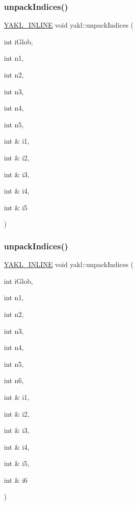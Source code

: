\mbox{\label{namespaceyakl_a030f82c405c0c5cc61833a5839a2398d}} 
\subsubsection{\texorpdfstring{unpack\+Indices()}{unpackIndices()}\hspace{0.1cm}{\footnotesize\ttfamily [4/7]}}
{\footnotesize\ttfamily \hyperlink{YAKL_8h_aa0dd629ffce6d564b19e9313fb91a5ad}{Y\+A\+K\+L\+\_\+\+I\+N\+L\+I\+NE} void yakl\+::unpack\+Indices (\begin{DoxyParamCaption}\item[{int}]{i\+Glob,  }\item[{int}]{n1,  }\item[{int}]{n2,  }\item[{int}]{n3,  }\item[{int}]{n4,  }\item[{int}]{n5,  }\item[{int \&}]{i1,  }\item[{int \&}]{i2,  }\item[{int \&}]{i3,  }\item[{int \&}]{i4,  }\item[{int \&}]{i5 }\end{DoxyParamCaption})}

\mbox{\label{namespaceyakl_ad0b25c0576e27b7e385b4bc404cdff49}} 
\subsubsection{\texorpdfstring{unpack\+Indices()}{unpackIndices()}\hspace{0.1cm}{\footnotesize\ttfamily [5/7]}}
{\footnotesize\ttfamily \hyperlink{YAKL_8h_aa0dd629ffce6d564b19e9313fb91a5ad}{Y\+A\+K\+L\+\_\+\+I\+N\+L\+I\+NE} void yakl\+::unpack\+Indices (\begin{DoxyParamCaption}\item[{int}]{i\+Glob,  }\item[{int}]{n1,  }\item[{int}]{n2,  }\item[{int}]{n3,  }\item[{int}]{n4,  }\item[{int}]{n5,  }\item[{int}]{n6,  }\item[{int \&}]{i1,  }\item[{int \&}]{i2,  }\item[{int \&}]{i3,  }\item[{int \&}]{i4,  }\item[{int \&}]{i5,  }\item[{int \&}]{i6 }\end{DoxyParamCaption})}

